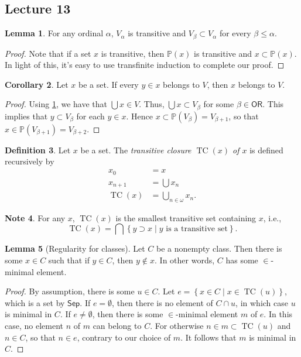 \documentclass[10pt,letterpaper,cm]{nupset}
\theoremstyle{definition}
\newtheorem{definition}{Definition}[subsection]
\newtheorem{note}[definition]{Note}
\theoremstyle{theorem}
\newtheorem{lemma}[definition]{Lemma}
\newtheorem{corollary}[definition]{Corollary}
\theoremstyle{remark}
\renewcommand{\P}{\mathbb P}
\newcommand{\1}{\mathbf{1}}
\newcommand{\0}{\vec 0}
\newcommand{\ord}{\mathsf{OR}}
\DeclareMathOperator{\tc}{TC}
\begin{document}
\subsection{Lecture 13}


\begin{lemma}\label{cum}
For any ordinal $\alpha$, $V_{\alpha}$ is transitive and $V_{\beta} \subset V_{\alpha}$ for every $\beta \leq \alpha$. 
\end{lemma}
\begin{proof}
Note that if a set $x$ is transitive, then  $\P(x)$ is transitive and $x\subset \P(x)$. In light of this, it's easy to use transfinite induction to complete our proof.
\end{proof}

\begin{corollary}
Let $x$ be a set. If every $y\in x$ belongs to $V$, then $x$ belongs to $V$. 
\end{corollary}
\begin{proof}
Using \cref{cum}, we have that $\bigcup{x} \in V$. Thus, $\bigcup{x}\subset V_{\beta}$ for some $\beta \in \ord$. This implies that $y \subset V_{\beta}$ for each $y\in x$. Hence $x\subset \P(V_{\beta}) = V_{\beta +1}$, so that $x \in \P(V_{\beta +1}) = V_{\beta +2}$.
\end{proof}

\begin{definition}
Let $x$ be a set. The \textit{transitive closure $\tc(x)$ of $x$} is defined recursively by
\begin{align*}
x_0 & = x
 \\ x_{n+1} & = \bigcup {x_n}
 \\ \tc(x) & = \bigcup_{n\in \omega} x_n.
\end{align*}
\end{definition}

\begin{note}
For any $x$, $\tc(x)$ is the smallest transitive set containing $x$, i.e., $$\tc(x) = \bigcap{\left\{y\supset x \mid y \text{ is a transitive set}\right\}}.$$
\end{note}

\begin{lemma}[Regularity for classes]\label{reg}
Let $C$ be a nonempty class. Then there is some $x\in C$ such that if $y\in C$, then $y \notin x$. In other words, $C$ has some $\in$-minimal element.
\end{lemma}
\begin{proof}
By assumption, there is some $u\in C$. Let $e = \left\{ x\in C \mid x \in \tc(u)\right\}$, which is a set by $\mathsf{Sep}$. If $e = \emptyset$, then there is no element of $C \cap u$, in which case $u$ is minimal in $C$. If $e\ne \emptyset$, then there is some $\in$-minimal element $m$ of $e$. In this case, no element $n$ of $m$ can belong to $C$. For otherwise $n\in m\subset \tc(u)$ and $n \in C$, so that $n \in e$, contrary to our choice of $m$. It follows that $m$ is minimal in $C$.
\end{proof}
\end{document}
